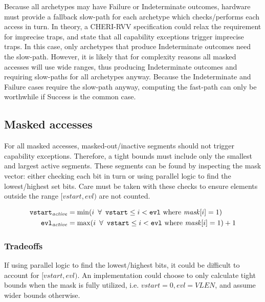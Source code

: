 Because all archetypes may have Failure or Indeterminate outcomes, hardware must provide a fallback slow-path for each archetype which checks/performs each access in turn.
In theory, a CHERI-RVV specification could relax the  requirement for imprecise traps, and state that all capability exceptions trigger imprecise traps.
In this case, only archetypes that produce Indeterminate outcomes need the slow-path.
However, it is likely that for complexity reasons all masked accesses will use wide ranges, thus producing Indeterminate outcomes and requiring slow-paths for all archetypes anyway.
Because the Indeterminate and Failure cases require the slow-path anyway, computing the fast-path can only be worthwhile if Success is the common case.

\newcommand{\vstart}{\code{vstart}}
\newcommand{\vstartactive}{\code{vstart}_{\mathit{active}}}
\newcommand{\evl}{\code{evl}}
\newcommand{\evlactive}{\code{evl}_{\mathit{active}}}
\newcommand{\baseaddr}{\mathit{base}}

\subsection{Masked accesses}
For all masked accesses, masked-out/inactive segments should not trigger capability exceptions.
Therefore, a tight bounds must include only the smallest and largest active segments.
These segments can be found by inspecting the mask vector: either checking each bit in turn or using parallel logic to find the lowest/highest set bits.
Care must be taken with these checks to ensure elements outside the range $[\textit{vstart}, \textit{evl})$ are not counted.

\begin{align}
    \vstartactive{} &= \min(i\ \forall\ \vstart{} \le i < \evl{}\ \text{where}\ \mathit{mask}[i] = 1) \\
    \evlactive{}    &= \max(i\ \forall\ \vstart{} \le i < \evl{}\ \text{where}\ \mathit{mask}[i] = 1) + 1
\end{align}

\subsubsection*{Tradeoffs}
If using parallel logic to find the lowest/highest bits, it could be difficult to account for $[\textit{vstart}, \textit{evl})$.
An implementation could choose to only calculate tight bounds when the mask is fully utilized, i.e. $\textit{vstart} = 0, \textit{evl} = \textit{VLEN}$, and assume wider bounds otherwise.

